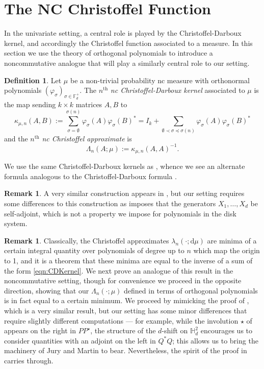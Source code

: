 \documentclass[11pt,reqno]{amsart}
\def\p{\varphi}
\def\l{\lambda}
\def\k{\kappa}
\def\s{\sigma}
\def\L{\Lambda}
\def\rmd{\mathrm{d}}
\def\FF{\mathbb{F}}
\def\HH{\mathbb{H}}
\theoremstyle{definition}
\newtheorem{definition}[theorem]{Definition}
\newtheorem{remark}[theorem]{Remark}
\numberwithin{equation}{section}
\begin{document}
\section{The NC Christoffel Function}

In the univariate setting, a central role is played by the Christoffel-Darboux kernel, and accordingly the Christoffel function associated to a measure. In this section we use the theory of orthogonal polynomials to introduce a noncommutative analogue that will play a similarly central role to our setting.

\begin{definition}
    \label{def:ncCDK}
    Let \(\mu\) be a non-trivial probability nc measure with orthonormal polynomials \((\p_\s)_{\s \in \FF_d^+}\). The \(n^{\mathrm{th}}\) \emph{nc Christoffel-Darboux kernel} associated to \(\mu\) is the map sending \(k\times k\) matrices \(A,B\) to
    \begin{equation}
        \label{eqn:CDKernel}
        \k_{\mu, n}(A,B) := \sum_{\s = \emptyset}^{\s(n)} \p_\s(A)\p_\s(B)^* = I_k + \sum_{\emptyset \prec \s \preceq \s(n)}  \p_\s(A)\p_\s(B)^*
    \end{equation}
    and the \(n^{\mathrm{th}}\) \emph{nc Christoffel approximate} is
    \[
        \L_{n}(A; \mu) := \k_{\mu, n}(A,A)^{-1}.
    \]
\end{definition}

We use the same Christoffel-Darboux kernels as \cite{CJ02b}, whence we see an alternate formula analogous to the Christoffel-Darboux formula \cite[Theorem 4.2]{CJ02b}.

\begin{remark} 
    A very similar construction appears in \cite{BMV23}, but our setting requires some differences to this construction as \cite{BMV23} imposes that the generators \(X_1, \ldots, X_d\) be self-adjoint, which is not a property we impose for polynomials in the disk system.
\end{remark}

\begin{remark}
    \label{rem:BMV}
    Classically, the Christoffel approximates \(\l_n(\cdot; \rmd \mu)\) are minima of a certain integral quantity over polynomials of degree up to \(n\) which map the origin to 1, and it is a theorem that these minima are equal to the inverse of a sum of the form \eqref{eqn:CDKernel}. We next prove an analogue of this result in the noncommutative setting, though for convenience we proceed in the opposite direction, showing that our \(\L_{n}(\cdot; \mu)\) defined in terms of orthogonal polynomials is in fact equal to a certain minimum. We proceed by mimicking the proof of \cite[Theorem 3.4]{BMV23}, which is a very similar result, but our setting has some minor differences that require slightly different computations --- for example, while the involution \(\star\) of \cite{BMV23} appears on the right in \(PP^{\star}\), the structure of the \(d\)-shift on \(\HH^2_d\) encourages us to consider quantities with an adjoint on the left in \(Q^*Q\); this allows us to bring the machinery of Jury and Martin to bear. Nevertheless, the spirit of the proof in \cite{BMV23} carries through.
\end{remark}
\end{document}
